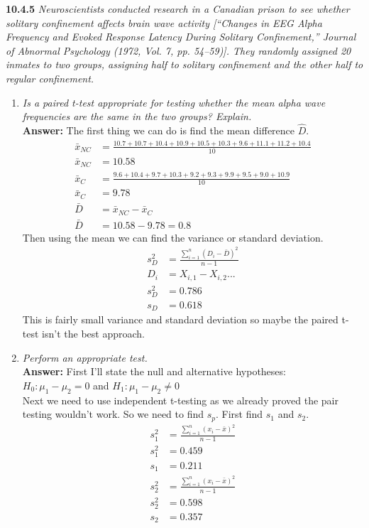 \documentclass[11pt]{article}
\begin{document}
\noindent \textbf{10.4.5} \emph{Neuroscientists conducted research in a Canadian prison to see whether solitary confinement affects brain wave activity [“Changes in EEG Alpha Frequency and Evoked Response Latency During Solitary Confinement,” Journal of Abnormal Psychology (1972, Vol. 7, pp. 54–59)]. They randomly assigned 20 inmates to two groups, assigning half to solitary confinement and the other half to regular confinement.}
\begin{enumerate}
\item \emph{Is a paired t-test appropriate for testing whether the mean alpha wave frequencies are the same in the two groups? Explain.}
\\\textbf{Answer:} 
The first thing we can do is find the mean difference $\hat{D}$.
\begin{equation}
\begin{split}
\bar{x}_{NC} &= \frac{10.7+10.7+10.4+10.9+10.5+10.3+9.6+11.1+11.2+10.4}{10} \\
\bar{x}_{NC} &= 10.58 \\
\bar{x}_{C} &= \frac{9.6+10.4+9.7+10.3+9.2+9.3+9.9+9.5+9.0+10.9}{10} \\
\bar{x}_{C} &= 9.78 \\
\bar{D} &= \bar{x}_{NC} - \bar{x}_{C}\\
\bar{D} &=10.58 - 9.78= 0.8
\end{split}
\end{equation}
Then using the mean we can find the variance or standard deviation. 
\begin{equation}
\begin{split}
s_D^2 &= \frac{\sum_{i=1}^{n}(D_i-\bar{D})^2}{n-1}\\
D_i&=X_{i,1} - X_{i,2}...\\
s_D^2 &= 0.786\\
s_D &=0.618
\end{split}
\end{equation}
This is fairly small variance and standard deviation so maybe the paired t-test isn't the best approach.
\item \emph{Perform an appropriate test.}
\\\textbf{Answer:} First I'll state the null and alternative hypotheses:\\
$H_0: \mu_1 - \mu_2 = 0$ and $H_1: \mu_1 - \mu_2 \neq 0$ \\
Next we need to use independent t-testing as we already proved the pair testing wouldn't work. So we need to find $s_p$. First find $s_1$ and $s_2$.
\begin{equation}
\begin{split}
s_1^2 &= \frac{\sum_{i=1}^{n}(x_i-\bar{x})^2}{n-1}\\
s_1^2 &= 0.459\\
s_1 &=0.211 \\
s_2^2 &= \frac{\sum_{i=1}^{n}(x_i-\bar{x})^2}{n-1}\\
s_2^2 &= 0.598\\
s_2 &=0.357 
\end{split}
\end{equation}



\end{enumerate}
\end{document}
